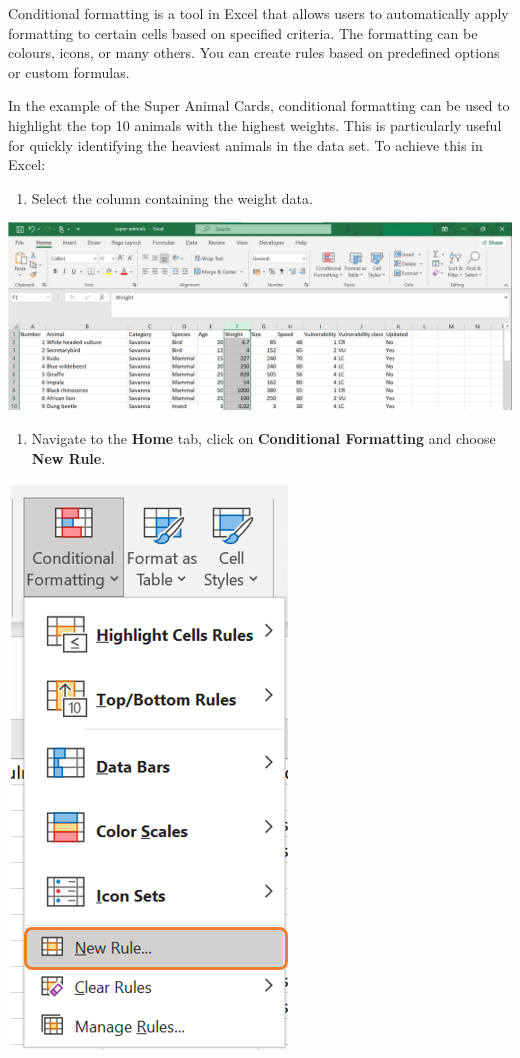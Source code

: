 \documentclass[
]{book}
\providecommand{\tightlist}{%
  \setlength{\itemsep}{0pt}\setlength{\parskip}{0pt}}
\begin{document}
Conditional formatting is a tool in Excel that allows users to automatically apply formatting to certain cells based on specified criteria. The formatting can be colours, icons, or many others. You can create rules based on predefined options or custom formulas.

In the example of the Super Animal Cards, conditional formatting can be used to highlight the top 10 animals with the highest weights. This is particularly useful for quickly identifying the heaviest animals in the data set. To achieve this in Excel:

\begin{enumerate}
\def\labelenumi{\arabic{enumi}.}
\tightlist
\item
  Select the column containing the weight data.
\end{enumerate}

\begin{center}\includegraphics[width=0.7\linewidth]{Figures/manipulation_2_1} \end{center}

\newpage

\begin{enumerate}
\def\labelenumi{\arabic{enumi}.}
\setcounter{enumi}{1}
\tightlist
\item
  Navigate to the \textbf{Home} tab, click on \textbf{Conditional Formatting} and choose \textbf{New Rule}.
\end{enumerate}

\begin{center}\includegraphics[width=0.3\linewidth]{Figures/manipulation_2_2} \end{center}
\end{document}

